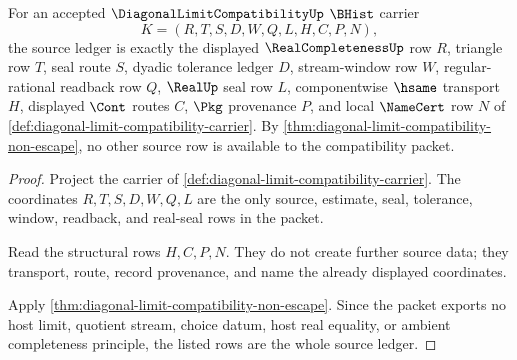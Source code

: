 \begin{theorem}
\label{thm:diagonal-limit-compatibility-source-ledger}
For an accepted $\DiagonalLimitCompatibilityUp$ $\BHist$ carrier
$$
K=(R,T,S,D,W,Q,L,H,C,P,N),
$$
the source ledger is exactly the displayed $\RealCompletenessUp$ row $R$,
triangle row $T$, seal route $S$, dyadic tolerance ledger $D$, stream-window
row $W$, regular-rational readback row $Q$, $\RealUp$ seal row $L$,
componentwise $\hsame$ transport $H$, displayed $\Cont$ routes $C$, $\Pkg$
provenance $P$, and local $\NameCert$ row $N$ of
\autoref{def:diagonal-limit-compatibility-carrier}. By
\autoref{thm:diagonal-limit-compatibility-non-escape}, no other source row is
available to the compatibility packet.
\end{theorem}
\begin{proof}
Project the carrier of
\autoref{def:diagonal-limit-compatibility-carrier}. The coordinates
$R,T,S,D,W,Q,L$ are the only source, estimate, seal, tolerance, window,
readback, and real-seal rows in the packet.

Read the structural rows $H,C,P,N$. They do not create further source data;
they transport, route, record provenance, and name the already displayed
coordinates.

Apply \autoref{thm:diagonal-limit-compatibility-non-escape}. Since the packet
exports no host limit, quotient stream, choice datum, host real equality, or
ambient completeness principle, the listed rows are the whole source ledger.
\end{proof}

